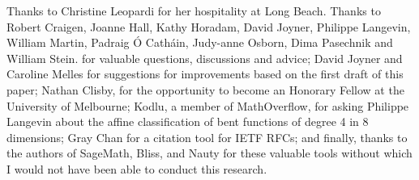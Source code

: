 \documentclass[12pt,a4paper]{article}
\begin{document}
Thanks to Christine Leopardi for her hospitality at Long Beach.
Thanks to
Robert Craigen,
Joanne Hall,
Kathy Horadam,
David Joyner,
Philippe Langevin,
William Martin,
Padraig {\'O} Cath{\'a}in,
Judy-anne Osborn,
Dima Pasechnik and
William Stein.
for valuable questions, discussions and advice;
David Joyner and Caroline Melles for suggestions for improvements based on the first draft of this paper;
Nathan Clisby, for the opportunity to become an Honorary Fellow at the University of Melbourne;
Kodlu, a member of MathOverflow, for asking Philippe Langevin about the affine classification
of bent functions of degree 4 in 8 dimensions;
Gray Chan for a citation tool for IETF RFCs;
and finally, thanks to the authors of SageMath, Bliss, and Nauty for these valuable tools
without which I would not have been able to conduct this research.









%
\end{document}
